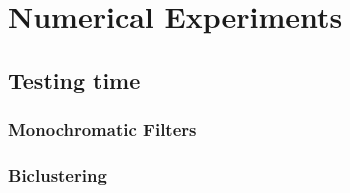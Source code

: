 \section{Numerical Experiments}

\subsection{Testing time}
    
\subsubsection{Monochromatic Filters}

\subsubsection{Biclustering}

